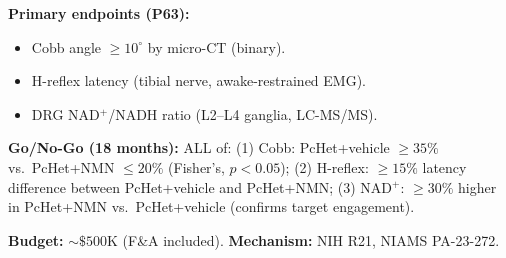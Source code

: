 \documentclass[12pt, letterpaper]{article}
\begin{document}
\textbf{Primary endpoints (P63):}
\begin{itemize}
  \item Cobb angle $\geq 10^{\circ}$ by micro-CT (binary).
  \item H-reflex latency (tibial nerve, awake-restrained EMG).
  \item DRG NAD$^{+}$/NADH ratio (L2--L4 ganglia, LC-MS/MS).
\end{itemize}

\textbf{Go/No-Go (18 months):} ALL of: (1) Cobb: PcHet+vehicle $\geq 35\%$
vs.\ PcHet+NMN $\leq 20\%$ (Fisher's, $p < 0.05$); (2) H-reflex: $\geq 15\%$
latency difference between PcHet+vehicle and PcHet+NMN; (3) NAD$^{+}$:
$\geq 30\%$ higher in PcHet+NMN vs.\ PcHet+vehicle (confirms target engagement).

\textbf{Budget:} $\sim\$500$K (F\&A included).
\textbf{Mechanism:} NIH R21, NIAMS PA-23-272.
\end{document}
